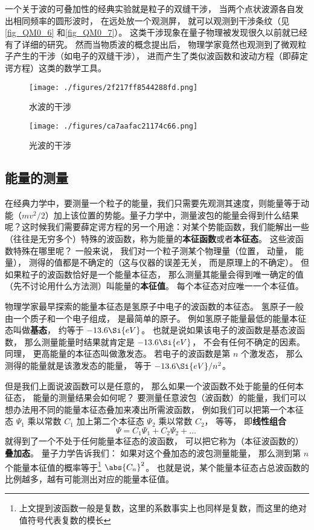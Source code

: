一个关于波的可叠加性的经典实验就是粒子的双缝干涉， 当两个点状波源各自发出相同频率的圆形波时， 在远处放一个观测屏， 就可以观测到干涉条纹（见\autoref{fig_QM0_6} 和\autoref{fig_QM0_7}）。 这类干涉现象在量子物理被发现很久以前就已经有了详细的研究。 然而当物质波的概念提出后， 物理学家竟然也观测到了微观粒子产生的干涉（如电子的双缝干涉）， 进而产生了类似波函数和波动方程（即薛定谔方程）这类的数学工具。

\begin{figure}[ht]
\centering
\texttt{[image: ./figures/2f217ff8544288fd.png]}
\caption{水波的干涉} \label{fig_QM0_6}
\end{figure}

\begin{figure}[ht]
\centering
\texttt{[image: ./figures/ca7aafac21174c66.png]}
\caption{光波的干涉} \label{fig_QM0_7}
\end{figure}


\subsection{能量的测量}
在经典力学中，要测量一个粒子的能量，我们只需要先观测其速度，则能量等于动能（$mv^2/2$）加上该位置的势能。量子力学中，测量波包的能量会得到什么结果呢？这时候我们需要薛定谔方程的另一个用途：对某个势能函数，我们能解出一些（往往是无穷多个）特殊的波函数，称为能量的\textbf{本征函数}或者\textbf{本征态}。 这些波函数特殊在哪里呢？ 一般来说， 我们对一个粒子测某个物理量（位置， 动量， 能量）， 测得的值都是不确定的（这与仪器的误差无关， 而是原理上的不确定）。 但如果粒子的波函数恰好是一个能量本征态， 那么测量其能量会得到唯一确定的值（先不讨论用什么方法测）叫能量的\textbf{本征值}。 每个本征态对应唯一一个本征值。

物理学家最早探索的能量本征态是氢原子中电子的波函数的本征态。 氢原子一般由一个质子和一个电子组成， 是最简单的原子。 例如氢原子能量最低的能量本征态叫做\textbf{基态}， 约等于 $-13.6\Si{eV}$。 也就是说如果该电子的波函数是基态波函数， 那么测量能量时结果就肯定是 $-13.6\Si{eV}$， 不会有任何不确定的因素。 同理， 更高能量的本征态叫做激发态。 若电子的波函数是第 $n$ 个激发态， 那么测得的能量就是该激发态的能量， 等于 $-13.6\Si{eV}/n^2$。

但是我们上面说波函数可以是任意的， 那么如果一个波函数不处于能量的任何本征态， 能量的测量结果会如何呢？ 要测量任意波包（波函数）的能量，我们可以想办法用不同的能量本征态叠加来凑出所需波函数， 例如我们可以把第一个本征态 $\Psi_1$ 乘以常数 $C_1$ 加上第二个本征态 $\Psi_2$ 乘以常数 $C_2$， 等等， 即\textbf{线性组合}
\begin{equation}
\Psi = C_1\Psi_1 + C_2\Psi_2 + \dots~
\end{equation}
就得到了一个不处于任何能量本征态的波函数， 可以把它称为（本征波函数的）\textbf{叠加态}。 量子力学告诉我们： 如果对这个叠加态的波包测量能量， 那么测到第 $n$ 个能量本征值的概率等于\footnote{上文提到波函数一般是复数，这里的系数事实上也同样是复数，而这里的绝对值符号代表复数的模长} $\abs{C_n}^2$。 也就是说，某个能量本征态占总波函数的比例越多，越有可能测出对应的能量本征值。

